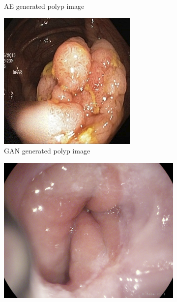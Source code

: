 \begin{figure}[h]
\begin{subfigure}[t]{\myfigsizethree}
            \caption{AE generated polyp image }   
            \label{fig:polyp_AE_SQUARE1}
        \end{subfigure}
        \qquad
        \begin{subfigure}[t]{\myfigsizethree}  
            \centering 
            \includegraphics[width=\textwidth]{experiments/figures/greensquare/polypGAN.png}
            \caption{GAN generated polyp image}   
            \label{fig:polyp_GAN_SQUARE1}
        \end{subfigure}
        \qquad\vfill%
        \begin{subfigure}[t]{\myfigsizethree}   
            \centering 
            \includegraphics[height=\textwidth ,width=\textwidth]{experiments/figures/greensquare/zORIG.png}

\end{subfigure}
\end{figure}
